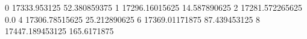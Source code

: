 0 17333.953125 52.380859375
1 17296.16015625 14.587890625
2 17281.572265625 0.0
4 17306.78515625 25.212890625
6 17369.01171875 87.439453125
8 17447.189453125 165.6171875
